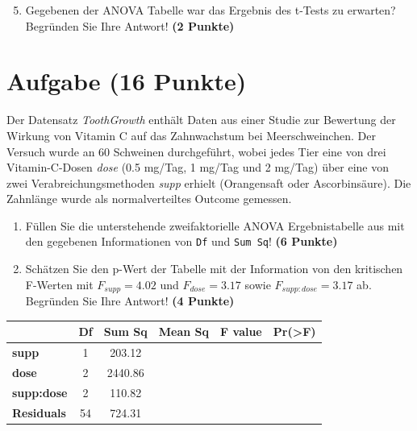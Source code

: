 \documentclass[a4paper, 10pt]{scrartcl}\usepackage[]{graphicx}\usepackage[]{color}
\begin{document}
\begin{enumerate}
  \setcounter{enumi}{4}
\item Gegebenen der ANOVA Tabelle war das Ergebnis des t-Tests zu erwarten?
  Begr{\"u}nden Sie Ihre Antwort! \textbf{(2 Punkte)}
\end{enumerate}

 
\clearpage

\section{Aufgabe \hfill (16 Punkte)}

Der Datensatz \textit{ToothGrowth} enth{\"a}lt Daten aus einer Studie zur
Bewertung der Wirkung von Vitamin C auf das Zahnwachstum bei
Meerschweinchen. Der Versuch wurde an 60 Schweinen durchgef{\"u}hrt, wobei
jedes Tier eine von drei Vitamin-C-Dosen \textit{dose} (0.5 mg/Tag, 1
mg/Tag und 2 mg/Tag) {\"u}ber eine von zwei Verabreichungsmethoden
\textit{supp} erhielt (Orangensaft oder Ascorbins{\"a}ure). Die Zahnl{\"a}nge wurde
als normalverteiltes Outcome gemessen.



\begin{enumerate}
\item F{\"u}llen Sie die unterstehende zweifaktorielle ANOVA Ergebnistabelle aus
  mit den gegebenen Informationen von \texttt{Df} und \texttt{Sum Sq}!
  \textbf{(6 Punkte)}
\item Sch{\"a}tzen Sie den p-Wert der Tabelle mit der Information von den
  kritischen F-Werten mit
  $F_{supp} = 4.02$ und
  $F_{dose} = 3.17$ sowie
  $F_{supp:dose} = 3.17$ ab. Begr{\"u}nden Sie Ihre
  Antwort! \textbf{(4 Punkte)}
\end{enumerate}

\vspace{1Ex}

\begin{center}
  \Large
  \begin{tabular}{l|c|c|c|c|c}
     & \textbf{Df} & \textbf{Sum Sq} & \textbf{Mean Sq} & \textbf{F value} & \textbf{Pr(>F)} \strut\\
    \hline
   \textbf{supp}  & 1 & 203.12 &  &  &  \strut\\
    \hline
    \textbf{dose}  & 2 & 2440.86 &  &  &  \strut\\
    \hline
    \textbf{supp:dose}  & 2 & 110.82 &  &  &  \strut\\
    \hline
   \textbf{Residuals}  & 54 & 724.31 &  &  &  \strut\\
  \end{tabular}
\end{center}
\end{document}
